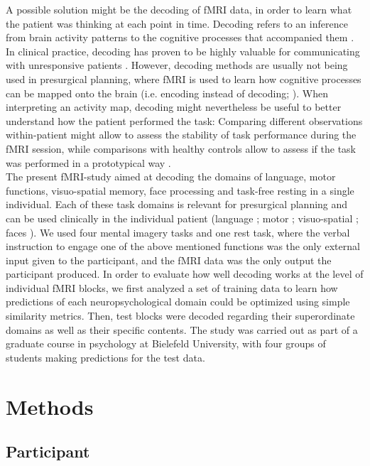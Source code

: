 \documentclass[fleqn,10pt]{SelfArx} %
\begin{document}
A possible solution might be the decoding of fMRI data, in order to learn what the patient was thinking at each point in time. Decoding refers to an inference from brain activity patterns to the cognitive processes that accompanied them \citep{Poldrack_2006,  Haynes_2006}. In clinical practice, decoding has proven to be highly valuable for communicating with unresponsive patients \citep{Owen_2006, Boly_2007, Sorger_2012}. However, decoding methods are usually not being used in presurgical planning, where fMRI is used to learn how cognitive processes can be mapped onto the brain (i.e. encoding instead of decoding; \citet{Naselaris_2011}). When interpreting an activity map, decoding might nevertheless be useful to better understand how the patient performed the task: Comparing different observations within-patient might allow to assess the stability of task performance during the fMRI session, while comparisons with healthy controls allow to assess if the task was performed in a prototypical way \citep{Dubois_2016}. \\
The present fMRI-study aimed at decoding the domains of language, motor functions, visuo-spatial memory, face processing and task-free resting in a single individual. Each of these task domains is relevant for presurgical planning and can be used clinically in the individual patient (language \citet{Woermann_2003}; motor \citet{H_berg_2004}; visuo-spatial \citet{Jokeit_2001}; faces \citet{Parvizi_2012}). We used four mental imagery tasks and one rest task, where the verbal instruction to engage one of the above mentioned functions was the only external input given to the participant, and the fMRI data was the only output the participant produced. 
In order to evaluate how well decoding works at the level of individual fMRI blocks, we first analyzed a set of training data to learn how predictions of each neuropsychological domain could be optimized using simple similarity metrics. Then, test blocks were decoded regarding their superordinate domains as well as their specific contents. The study was carried out as part of a graduate course in psychology at Bielefeld University, with four groups of students making predictions for the test data.

\section{Methods}

\subsection{Participant}
\end{document}
